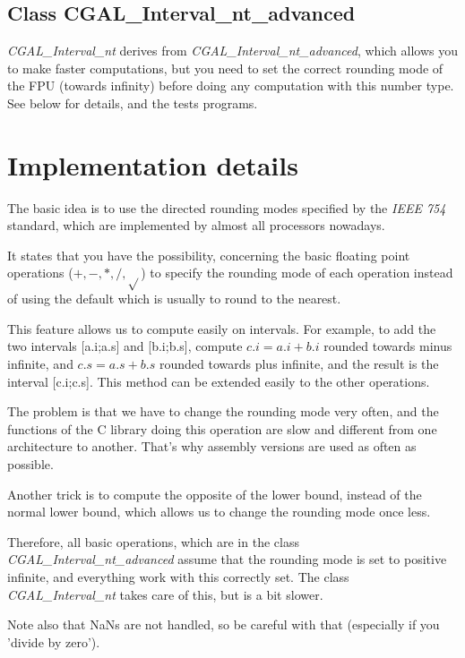 \subsection {Class CGAL\_Interval\_nt\_advanced}

{\it CGAL\_Interval\_nt} derives from {\it CGAL\_Interval\_nt\_advanced},
which allows you to make faster computations, but you need to set the correct
rounding mode of the FPU (towards infinity) before doing any computation with
this number type.  See below for details, and the tests programs.


\section{Implementation details}

The basic idea is to use the directed rounding modes specified by the {\it
IEEE 754} standard, which are implemented by almost all processors nowadays.

It states that you have the possibility, concerning the basic floating point
operations ($+,-,*,/,\sqrt{}$) to specify the rounding mode of each operation
instead of using the default which is usually to round to the nearest.

This feature allows us to compute easily on intervals.  For example, to add
the two intervals [a.i;a.s] and [b.i;b.s], compute $c.i=a.i+b.i$ rounded
towards minus infinite, and $c.s=a.s+b.s$ rounded towards plus infinite, and
the result is the interval [c.i;c.s].  This method can be extended easily to
the other operations.

\smallskip

The problem is that we have to change the rounding mode very often, and the
functions of the C library doing this operation are slow and different from
one architecture to another.  That's why assembly versions are used as often
as possible.

Another trick is to compute the opposite of the lower bound, instead of the
normal lower bound, which allows us to change the rounding mode once less.

Therefore, all basic operations, which are in the class {\it
CGAL\_Interval\_nt\_advanced} assume that the rounding mode is set to positive
infinite, and everything work with this correctly set.  The class {\it
CGAL\_Interval\_nt} takes care of this, but is a bit slower.

\smallskip

Note also that NaNs are not handled, so be careful with that
(especially if you 'divide by zero').


